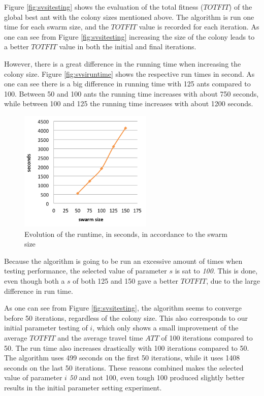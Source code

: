 Figure \vref{fig:svsitesting} shows the evaluation of the total fitness ($TOTFIT$) of the global best ant with the colony sizes mentioned above. The algorithm is run one time for each swarm size, and the $TOTFIT$ value is recorded for each iteration. As one can see from Figure \vref{fig:svsitesting} increasing the size of the colony leads to a better $TOTFIT$ value in both the initial and final iterations.  %

However, there is a great difference in the running time when increasing the colony size. Figure \vref{fig:svsiruntime} shows the respective run times in second. As one can see there is a big difference in running time with 125 ants compared to 100. Between 50 and 100 ants the running time increases with about 750 seconds, while between 100 and 125 the running time increases with about 1200 seconds. 

\begin{figure}[H]
\begin{center}
  \includegraphics[width=2.5in]{assets/svsiruntime.png}
  \end{center}
  \caption{Evolution of the runtime, in seconds, in accordance to the swarm size}
  \label{fig:svsiruntime} 
\end{figure}

Because the algorithm is going to be run an excessive amount of times when testing performance, the selected value of parameter $s$ is sat to \textit{100}. This is done, even though both a $s$ of both 125 and 150 gave a better $TOTFIT$, due to the large difference in run time. 

As one can see from Figure \vref{fig:svsitesting}, the algorithm seems to converge before 50 iterations, regardless of the colony size. This also corresponds to our initial parameter testing of $i$, which only shows a small improvement of the average $TOTFIT$ and the average travel time $ATT$ of 100 iterations compared to 50. The run time also increases drastically with 100 iterations compared to 50. The algorithm uses 499 seconds on the first 50 iterations, while it uses 1408 seconds on the last 50 iterations. These reasons combined makes the selected value of parameter $i$ \textit{50} and not 100, even tough 100 produced slightly better results in the initial parameter setting experiment.

